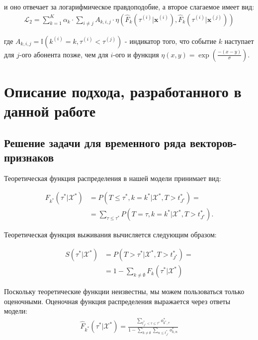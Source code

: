 \documentclass[a4paper,14pt,oneside,openany]{memoir}
\begin{document}
и оно отвечает за логарифмическое правдоподобие, а второе слагаемое имеет вид: 
\begin{equation}
	\begin{aligned}
		\mathcal{L}_2=\sum_{k=1}^K\alpha_k\cdot\sum_{i\neq j}A_{k,i,j}\cdot\eta\left(\hat{F}_k(\tau^{(i)}|\mathbf{x}^{(i)}),\hat{F}_k(\tau^{(i)}|\mathbf{x}^{(j)})\right)
	\end{aligned}
\end{equation}

где $A_{k,i,j} = \mathbb{I}(k^{(i)}=k,\tau^{(i)}<\tau^{(j)})$ - индикатор того, что событие $k$ наступает для $j$-ого абонента позже, чем для $i$-ого и функция
$\eta(x,y)=\exp\left(\frac{-(x-y)}{\sigma}\right)$. 

\chapter{Описание подхода, разработанного в данной работе}


\section{Решение задачи для временного ряда векторов-признаков}

Теоретическая функция распределения в нашей модели принимает вид:

\begin{equation}
	\begin{aligned}
		F_{k^{*}}(\tau^{*}|\mathcal{X}^{*}) & = P(T\leq\tau^{*},k=k^{*}|\mathcal{X}^{*},T>t_{J^{*}}^{*}) = \\
		& =\sum_{\tau\leq\tau^*}P(T=\tau,k=k^*|\mathcal{X}^*,T>t_{J^*}^*).
	\end{aligned}
\end{equation}

Теоретическая функция выживания вычисляется следующим образом:

\begin{equation}
	\begin{aligned}
		S(\tau^{*}|\mathcal{X}^{*}) & = 
		P(T>\tau^*|\mathcal{X}^*,T>t_{J^*}^*) =\\
		& =1-\sum_{k\neq\emptyset}F_k(\tau^*|\mathcal{X}^*)
	\end{aligned}
\end{equation}

Поскольку теоретические функции неизвестны, мы можем пользоваться только оценочными. Оценочная функция распределения выражается через ответы модели:
\begin{equation}
	\begin{aligned}
		\hat{F}_{k^*}(\tau^*|\mathcal{X}^*)=\frac{\sum_{t_{J^*}^*<\tau\leq\tau^*}o_{k^*,\tau}^*}{1-\sum_{k\neq\emptyset}\sum_{n\leq t_{J^*}^*}o_{k,n}^*}
	\end{aligned}
\end{equation}
\end{document}
